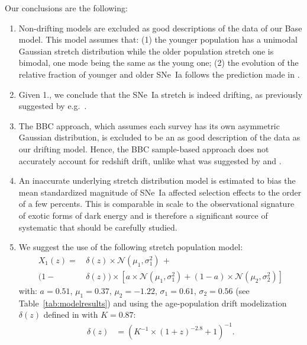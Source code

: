 \documentclass[]{aa} %
\begin{document}
Our conclusions are the following:
\begin{enumerate}

    \item Non-drifting models are excluded as good descriptions of the data of
        our Base model. This model assumes that: (1) the younger population has
        a unimodal Gaussian stretch distribution while the older population
        stretch one is bimodal, one mode being the same as the young one; (2)
        the evolution of the relative fraction of younger and older SNe~Ia
        follows the prediction made in \cite{rigault2018}. 

    \item Given 1., we conclude that the SNe~Ia stretch is indeed drifting, as
        previously suggested by e.g.~\cite{howell2007}. 

    \item The BBC approach, which assumes each survey has its own asymmetric
        Gaussian distribution, is excluded to be an as good description of the
        data as our drifting model. Hence, the BBC sample-based approach does
        not accurately account for redshift drift, unlike what was suggested by
        \cite{scolnic2016} and \cite{scolnic2018a}.

    \item An inaccurate underlying stretch distribution model is estimated to
        bias the mean standardized magnitude of SNe~Ia affected selection
        effects to the order of a few percents. This is comparable in scale to
        the observational signature of exotic forms of dark energy and is
        therefore a significant source of systematic that should be carefully
        studied.

    \item We suggest the use of the following stretch population model:
        \begin{align}
            \label{eqconclusion:stretchz}
            X_1\left(z \right) =
             &\,\delta(z)\times\mathcal{N}(\mu_1,\sigma_1^2)\,+\nonumber\\
            (1-&\,\delta(z)) \times  \left[a\times\mathcal{N}(\mu_1,\sigma_1^2) +
            (1-a)\times\mathcal{N}(\mu_2,\sigma_2^2)\right]
        \end{align}
    with: $a=0.51$, $\mu_1=0.37$, $\mu_2=-1.22$, $\sigma_1=0.61$,
    $\sigma_2=0.56$ (see Table~\ref{tab:modelresults}) and using the
    age-population drift modelization $\delta(z)$ defined in \cite{rigault2018}
    with $K=0.87$:
    \begin{align}
        \delta(z) & = \left( K^{-1} \times (1+z)^{-2.8} +1 \right)^{-1}.
    \end{align}
\end{enumerate}
\end{document}
